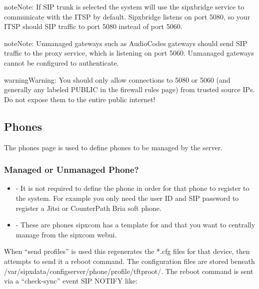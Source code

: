 \documentclass[letterpaper,10pt,english]{sphinxmanual}
\begin{document}
\begin{sphinxadmonition}{note}{Note:}
If SIP trunk is selected the system will use the sipxbridge service to communicate with the ITSP by default. Sipxbridge listens on port 5080, so your ITSP should SIP traffic to port 5080 instead of port 5060.
\end{sphinxadmonition}

\begin{sphinxadmonition}{note}{Note:}
Unmanaged gateways such as AudioCodes gateways should send SIP traffic to the proxy service, which is listening on port 5060. Unmanaged gateways cannot be configured to authenticate.
\end{sphinxadmonition}

\begin{sphinxadmonition}{warning}{Warning:}
You should only allow connections to 5080 or 5060 (and generally any labeled PUBLIC in the firewall rules page) from trusted source IPs. Do not expose them to the entire public internet!
\end{sphinxadmonition}


\subsection{Phones}
\label{\detokenize{webui:phones}}\label{\detokenize{webui:id4}}
The phones page is used to define phones to be managed by the server.


\subsubsection{Managed or Unmanaged Phone?}
\label{\detokenize{webui:managed-or-unmanaged-phone}}
\begin{itemize}
\item {} 
 - It is not required to define the phone in order for that phone to register to the system. For example you only need the user ID and SIP password to register a Jitsi or CounterPath Bria soft phone.

\item {} 
 - These are phones sipxcom has a template for and that you want to centrally manage from the sipxcom webui.

\end{itemize}

When “send profiles” is used this regenerates the *.cfg files for that device, then attempts to send it a reboot command.
The configuration files are stored beneath /var/sipxdata/configserver/phone/profile/tftproot/.
The reboot command is sent via a “check-sync” event SIP NOTIFY like:
\end{document}

